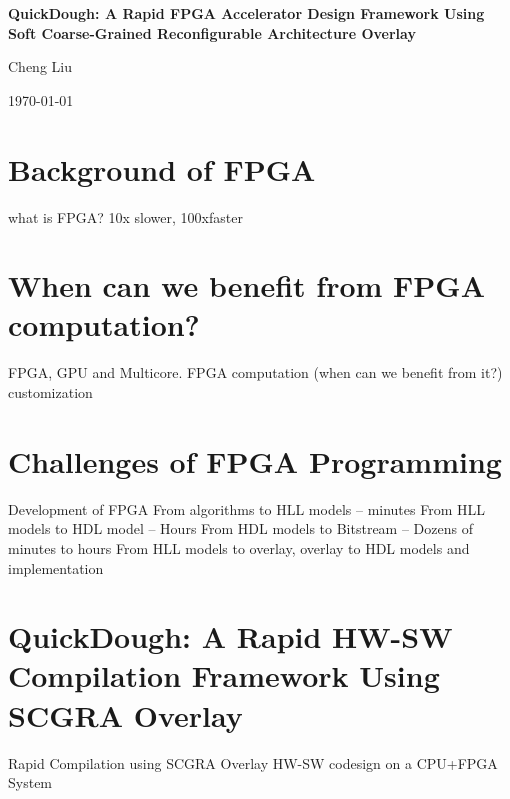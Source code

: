 \documentclass[
	paper=128mm:96mm,	%
	fontsize=11pt,					%
	pagesize,							%
	parskip=half-,					%
	numbers=noendperiod,	%
	captions=nooneline			%
	]{scrartcl}							%
\newcommand*{\mytitle}{QuickDough: A Rapid FPGA Accelerator Design Framework 
Using Soft Coarse-Grained Reconfigurable Architecture Overlay}		%
\newcommand*{\mytitleontitlepage}{\mytitle}	%
\newcommand*{\myauthor}{Cheng Liu}				%
\newcommand*{\mydate}{\today}						%
\theoremstyle{mythmstyle}
\begin{document}
%
%
\thispagestyle{empty}
%
\begin{flushright}
	\vspace{0.2cm}
	\color{white}\sffamily
	{\bfseries\Large\mytitleontitlepage\par}
   \vspace{0.2cm}
	\normalsize
   \myauthor\par
   \mydate\par
	\vfill
\end{flushright}
\clearpage
%
%
%
%
\section{Background of FPGA}
what is FPGA?
10x slower, 100xfaster

\clearpage
\section{When can we benefit from FPGA computation?}
FPGA, GPU and Multicore.
FPGA computation (when can we benefit from it?) customization
\clearpage

\section{Challenges of FPGA Programming}
Development of FPGA
From algorithms to HLL models -- minutes
From HLL models to HDL model -- Hours
From HDL models to Bitstream -- Dozens of minutes to hours
From HLL models to overlay, overlay to HDL models and implementation
\clearpage

%
%
\section{QuickDough: A Rapid HW-SW Compilation Framework Using SCGRA Overlay}
Rapid Compilation using SCGRA Overlay 
HW-SW codesign on a CPU+FPGA System
\end{document}
